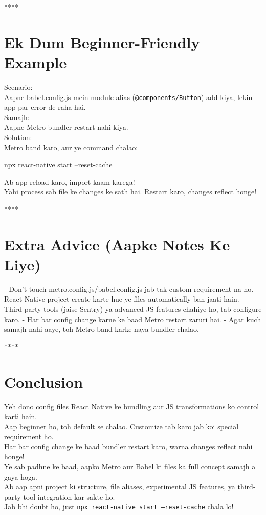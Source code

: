 \documentclass[a4paper]{article}
\newcommand\imp[1]{{\color{ImportantRed}#1}}
\begin{document}
{****
\section*{Ek Dum Beginner-Friendly Example}
\imp{Scenario:}\\
Aapne babel.config.js mein module alias (\texttt{@components/Button}) add kiya, lekin app par error de raha hai.\\
\imp{Samajh:}\\
Aapne Metro bundler restart nahi kiya.\\
\imp{Solution:}\\
Metro band karo, aur ye command chalao:\\
\begin{codeblock}
npx react-native start --reset-cache
\end{codeblock}
Ab app reload karo, import kaam karega!\\
\imp{Yahi process sab file ke changes ke sath hai. Restart karo, changes reflect honge!}

****
\section*{Extra Advice (Aapke Notes Ke Liye)}
- \imp{Don’t touch metro.config.js/babel.config.js jab tak custom requirement na ho.}
- \imp{React Native project create karte hue ye files automatically ban jaati hain.}
- \imp{Third-party tools (jaise Sentry) ya advanced JS features chahiye ho, tab configure karo.}
- \imp{Har bar config change karne ke baad Metro restart zaruri hai.}
- \imp{Agar kuch samajh nahi aaye, toh Metro band karke naya bundler chalao.}

****
\section*{Conclusion}
\imp{Yeh dono config files React Native ke bundling aur JS transformations ko control karti hain.}\\
\imp{Aap beginner ho, toh default se chalao. Customize tab karo jab koi special requirement ho.}\\
\imp{Har bar config change ke baad bundler restart karo, warna changes reflect nahi honge!}\\
\imp{Ye sab padhne ke baad, aapko Metro aur Babel ki files ka full concept samajh a gaya hoga.}\\
\imp{Ab aap apni project ki structure, file aliases, experimental JS features, ya third-party tool integration kar sakte ho.}\\
\imp{Jab bhi doubt ho, just \texttt{npx react-native start --reset-cache} chala lo!}

}
\end{document}
